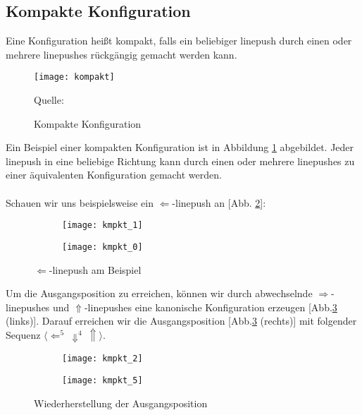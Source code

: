 \documentclass[seminar,german]{algothesis}
\newcommand*{\quelle}{%
  \footnotesize Quelle:
}
\begin{document}
\subsection{Kompakte Konfiguration}
\begin{definition}
Eine Konfiguration heißt kompakt, falls ein beliebiger linepush durch einen oder mehrere linepushes rückgängig gemacht werden kann.
\end{definition}
\begin{figure}[ht]
	\centering
	\texttt{[image: kompakt]}
	\caption{Kompakte Konfiguration}
	\quelle \cite{akitaya2022pushing}
	\label{fig:4}
\end{figure}
\noindent Ein Beispiel einer kompakten Konfiguration ist in Abbildung \ref{fig:4} abgebildet. Jeder linepush in eine beliebige Richtung kann durch einen oder mehrere linepushes zu einer äquivalenten Konfiguration gemacht werden. \\\\
Schauen wir uns beispielsweise ein $\Leftarrow$-linepush an [Abb. \ref{fig:kmpkt1}]:

\begin{figure}[ht]
	\centering
	\begin{subfigure}{.4\textwidth}
		\texttt{[image: kmpkt\_1]}
    \end{subfigure}%
    \begin{subfigure}{.4\textwidth}
		\texttt{[image: kmpkt\_0]}
    \end{subfigure}
    \caption{$\Leftarrow$-linepush am Beispiel}
    \label{fig:kmpkt1}
\end{figure}

\noindent Um die Ausgangsposition zu erreichen, können wir durch abwechselnde $\Rightarrow$-linepushes und $\Uparrow$-linepushes eine kanonische Konfiguration erzeugen [Abb.\ref{fig:kmpkt2} (links)]. Darauf erreichen wir die Ausgangsposition [Abb.\ref{fig:kmpkt2} (rechts)] mit folgender Sequenz $\langle  \Leftarrow^5~\Downarrow^4 ~\Uparrow\rangle$.

\begin{figure}[ht]
	\centering
	\begin{subfigure}{.4\textwidth}
		\texttt{[image: kmpkt\_2]}
    \end{subfigure}%
    \begin{subfigure}{.4\textwidth}
		\texttt{[image: kmpkt\_5]}
    \end{subfigure}
    \caption{Wiederherstellung der Ausgangsposition}
	\label{fig:kmpkt2}
\end{figure}
\newpage
\end{document}
